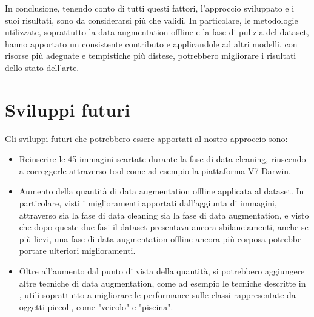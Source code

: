 In conclusione, tenendo conto di tutti questi fattori, l'approccio sviluppato e i suoi risultati, sono da considerarsi più che validi. In particolare, le metodologie utilizzate, soprattutto la data augmentation offline e la fase di pulizia del dataset, hanno apportato un consistente contributo e applicandole ad altri modelli, con risorse più adeguate e tempistiche più distese, potrebbero migliorare i risultati dello stato dell'arte.





\section{Sviluppi futuri}
Gli sviluppi futuri che potrebbero essere apportati al nostro approccio sono:

\begin{itemize}

    \item Reinserire le 45 immagini scartate durante la fase di data cleaning, riuscendo a correggerle attraverso tool come ad esempio la piattaforma V7 Darwin.

    \item Aumento della quantità di data augmentation offline applicata al dataset. In particolare, visti i miglioramenti apportati dall'aggiunta di immagini, attraverso sia la fase di data cleaning sia la fase di data augmentation, e visto che dopo queste due fasi il dataset presentava ancora sbilanciamenti, anche se più lievi, una fase di data augmentation offline ancora più corposa potrebbe portare ulteriori miglioramenti.
    
    \item Oltre all'aumento dal punto di vista della quantità, si potrebbero aggiungere altre tecniche di data augmentation, come ad esempio le tecniche descritte in \cite{small_obj}, utili soprattutto a migliorare le performance sulle classi rappresentate da oggetti piccoli, come "veicolo" e "piscina".
    
    
    
\end{itemize}